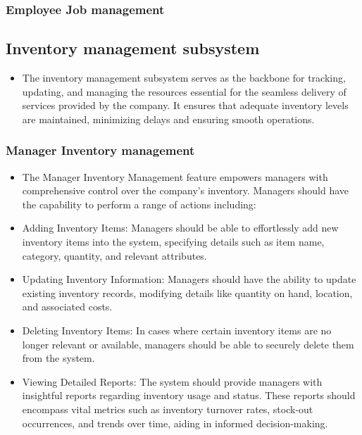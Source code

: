 \documentclass{article}
\begin{document}
	\subsubsection*{Employee Job management}	
	\subsection*{Inventory management subsystem}
\begin{itemize}
    \item The inventory management subsystem serves as the backbone for tracking, updating, and managing the resources essential for the seamless delivery of services provided by the company. It ensures that adequate inventory levels are maintained, minimizing delays and ensuring smooth operations.
\end{itemize}
\subsubsection*{Manager Inventory management}	
\begin{itemize}
    \item The Manager Inventory Management feature empowers managers with comprehensive control over the company's inventory. Managers should have the capability to perform a range of actions including:
    \item Adding Inventory Items: Managers should be able to effortlessly add new inventory items into the system, specifying details such as item name, category, quantity, and relevant attributes.
    \item Updating Inventory Information: Managers should have the ability to update existing inventory records, modifying details like quantity on hand, location, and associated costs.
    \item Deleting Inventory Items: In cases where certain inventory items are no longer relevant or available, managers should be able to securely delete them from the system.
    \item Viewing Detailed Reports: The system should provide managers with insightful reports regarding inventory usage and status. These reports should encompass vital metrics such as inventory turnover rates, stock-out occurrences, and trends over time, aiding in informed decision-making.
\end{itemize}
\end{document}

